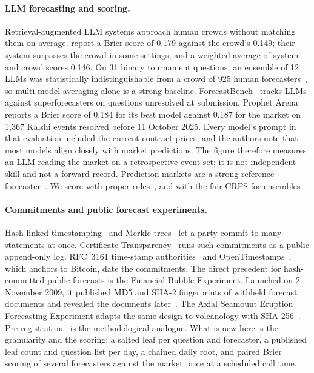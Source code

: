 \documentclass[11pt]{article}
\begin{document}
\paragraph{LLM forecasting and scoring.} Retrieval-augmented LLM systems approach human crowds without matching them on average. \citet{halawi2024approaching} report a Brier score of 0.179 against the crowd's 0.149; their system surpasses the crowd in some settings, and a weighted average of system and crowd scores 0.146. On 31 binary tournament questions, an ensemble of 12 LLMs was statistically indistinguishable from a crowd of 925 human forecasters~\citep{schoenegger2024wisdom}, so multi-model averaging alone is a strong baseline. ForecastBench~\citep{karger2024forecastbench} tracks LLMs against superforecasters on questions unresolved at submission. Prophet Arena~\citep{yang2025prophet} reports a Brier score of 0.184 for its best model against 0.187 for the market on 1,367 Kalshi events resolved before 11 October 2025. Every model's prompt in that evaluation included the current contract prices, and the authors note that most models align closely with market predictions. The figure therefore measures an LLM reading the market on a retrospective event set; it is not independent skill and not a forward record. Prediction markets are a strong reference forecaster~\citep{wolfers2004prediction}. We score with proper rules~\citep{brier1950verification,gneiting2007strictly}, and with the fair CRPS for ensembles~\citep{ferro2014fair}.

\paragraph{Commitments and public forecast experiments.} Hash-linked timestamping~\citep{haber1991timestamp} and Merkle trees~\citep{merkle1988digital} let a party commit to many statements at once. Certificate Transparency~\citep{rfc6962} runs such commitments as a public append-only log. RFC~3161 time-stamp authorities~\citep{rfc3161} and OpenTimestamps~\citep{opentimestamps}, which anchors to Bitcoin, date the commitments. The direct precedent for hash-committed public forecasts is the Financial Bubble Experiment. Launched on 2 November 2009, it published MD5 and SHA-2 fingerprints of withheld forecast documents and revealed the documents later~\citep{sornette2009financial}. The Axial Seamount Eruption Forecasting Experiment adapts the same design to volcanology with SHA-256~\citep{lei2025axial}. Pre-registration~\citep{nosek2018preregistration} is the methodological analogue. What is new here is the granularity and the scoring: a salted leaf per question and forecaster, a published leaf count and question list per day, a chained daily root, and paired Brier scoring of several forecasters against the market price at a scheduled call time.
\end{document}
